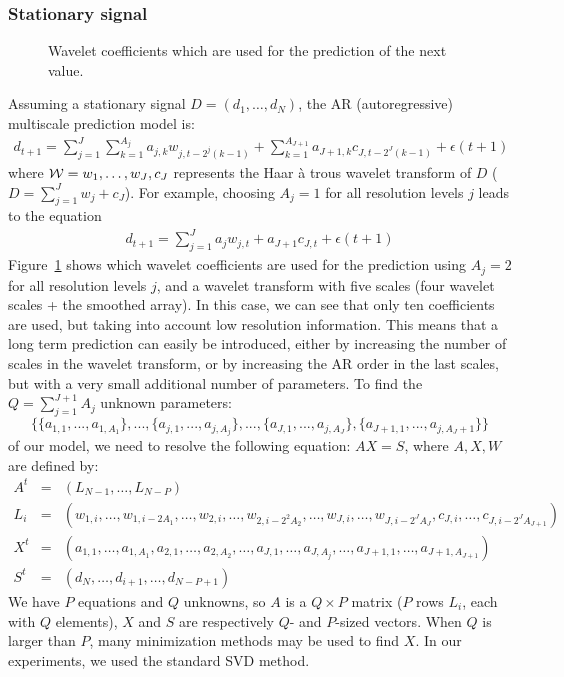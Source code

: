 \subsubsection{Stationary signal}

\begin{figure}[htb]
\centerline{
\vbox{ 
}}
\caption{Wavelet coefficients which are used for the prediction of the next value.}
\label{fig_haarpred}
\end{figure}  
Assuming a stationary signal $D = (d_1, \dots, d_N)$,
the AR (autoregressive) multiscale prediction model is:
\begin{eqnarray}
d_{t+1} = \sum_{j=1}^J \sum_{k=1}^{A_j} a_{j,k} w_{j,t-2^{j}(k-1)}  +
\sum_{k=1}^{A_{J+1}} a_{J+1,k} c_{J,t-2^{J}(k-1)}  + \epsilon(t+1)
\end{eqnarray}
where ${\cal W} = {w_{1}, \dots, w_J, c_J}$ represents the Haar \`a trous
wavelet transform of $D$ ($D = \sum_{j=1}^J w_j + c_J$).
For example, choosing $A_j = 1$ for all resolution levels $j$ leads 
to the equation
\begin{eqnarray}
d_{t+1} = \sum_{j=1}^J  a_{j} w_{j,t} + a_{J+1} c_{J,t}  + \epsilon(t+1)
\end{eqnarray}
Figure~\ref{fig_haarpred} shows which wavelet coefficients are used 
for the prediction using  $A_j = 2$ for all resolution levels $j$,
and a wavelet transform with five scales (four wavelet scales + the
smoothed array). In this case, we can see that only ten coefficients 
are used, but taking into account low resolution information. This means
that a long term prediction can easily be introduced, either by increasing
the number of scales in the wavelet transform, or by increasing the 
AR order in the last scales, but with a very small additional number of
parameters.
To find the $Q = \sum_{j=1}^{J+1} A_{j}$ unknown parameters: \\ 
$$\{\{a_{1,1},...,a_{1,A_1}\},..., 
\{a_{j,1},...,a_{j,A_j}\},..., 
\{a_{J,1},...,a_{j,A_J}\},\{a_{J+1,1},...,a_{j,A_J+1}\}\}$$ 
of our model, we need to resolve the following equation: $A X = S$,
where $A,X,W$ are defined by:
\begin{eqnarray*}
A^t & = & (L_{N-1}, \dots, L_{N-P}) \\
L_i & = & (w_{1,i}, \dots, w_{1,i-2 A_1}, \dots, w_{2,i}, \dots, w_{2,i-2^2 A_2},
\dots, w_{J,i}, \dots, w_{J,i-2^J A_J}, c_{J,i}, \dots, c_{J,i-2^J A_{J+1}}) \\ 
X^t & = & (a_{1,1},\dots, a_{1,A_1},a_{2,1}, \dots,a_{2,A_2},
 \dots, a_{J,1}, \dots, a_{J,A_j}, \dots, a_{J+1,1}, 
 \dots, a_{J+1,A_{J+1}})  \\
S^t & = & (d_N, \dots, d_{i+1},  \dots, d_{N-P+1})  
\end{eqnarray*}
We have $P$ equations and $Q$ unknowns, so $A$ is a $Q \times P$ matrix 
($P$ rows
$L_i$, each with $Q$ elements),
$X$ and $S$ are respectively $Q$- and $P$-sized vectors. When $Q$ is larger
than $P$, many minimization methods may be used to find $X$. In our experiments,
we used the standard SVD method.


